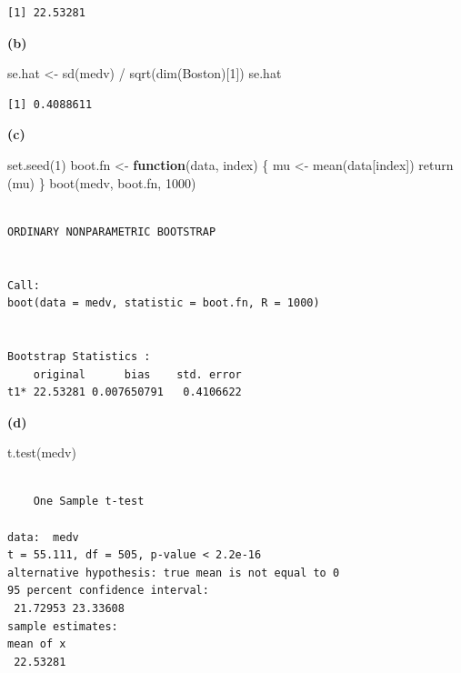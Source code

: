 \documentclass[
  letterpaper,
  DIV=11,
  numbers=noendperiod]{scrartcl}
\newenvironment{Shaded}{\begin{snugshade}}{\end{snugshade}}
\newcommand{\ControlFlowTok}[1]{\textcolor[rgb]{0.00,0.23,0.31}{\textbf{#1}}}
\newcommand{\DecValTok}[1]{\textcolor[rgb]{0.68,0.00,0.00}{#1}}
\newcommand{\FunctionTok}[1]{\textcolor[rgb]{0.28,0.35,0.67}{#1}}
\newcommand{\NormalTok}[1]{\textcolor[rgb]{0.00,0.23,0.31}{#1}}
\newcommand{\OtherTok}[1]{\textcolor[rgb]{0.00,0.23,0.31}{#1}}
\newcommand{\SpecialCharTok}[1]{\textcolor[rgb]{0.37,0.37,0.37}{#1}}
\begin{document}
\begin{verbatim}
[1] 22.53281
\end{verbatim}

\textbf{(b)}

\begin{Shaded}
\begin{Highlighting}[]
\NormalTok{se.hat }\OtherTok{\textless{}{-}} \FunctionTok{sd}\NormalTok{(medv) }\SpecialCharTok{/} \FunctionTok{sqrt}\NormalTok{(}\FunctionTok{dim}\NormalTok{(Boston)[}\DecValTok{1}\NormalTok{])}
\NormalTok{se.hat}
\end{Highlighting}
\end{Shaded}

\begin{verbatim}
[1] 0.4088611
\end{verbatim}

\textbf{(c)}

\begin{Shaded}
\begin{Highlighting}[]
\FunctionTok{set.seed}\NormalTok{(}\DecValTok{1}\NormalTok{)}
\NormalTok{boot.fn }\OtherTok{\textless{}{-}} \ControlFlowTok{function}\NormalTok{(data, index) \{}
\NormalTok{    mu }\OtherTok{\textless{}{-}} \FunctionTok{mean}\NormalTok{(data[index])}
    \FunctionTok{return}\NormalTok{ (mu)}
\NormalTok{\}}
\FunctionTok{boot}\NormalTok{(medv, boot.fn, }\DecValTok{1000}\NormalTok{)}
\end{Highlighting}
\end{Shaded}

\begin{verbatim}

ORDINARY NONPARAMETRIC BOOTSTRAP


Call:
boot(data = medv, statistic = boot.fn, R = 1000)


Bootstrap Statistics :
    original      bias    std. error
t1* 22.53281 0.007650791   0.4106622
\end{verbatim}

\textbf{(d)}

\begin{Shaded}
\begin{Highlighting}[]
\FunctionTok{t.test}\NormalTok{(medv)}
\end{Highlighting}
\end{Shaded}

\begin{verbatim}

    One Sample t-test

data:  medv
t = 55.111, df = 505, p-value < 2.2e-16
alternative hypothesis: true mean is not equal to 0
95 percent confidence interval:
 21.72953 23.33608
sample estimates:
mean of x 
 22.53281 
\end{verbatim}
\end{document}
